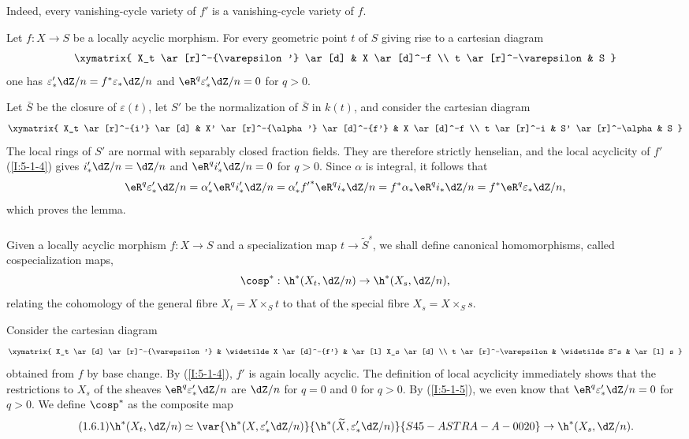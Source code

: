 Indeed, every vanishing-cycle variety of $f'$ is a vanishing-cycle
variety of $f$.

\begin{lemma}\label{I:5-1-5}
Let $f:X\to S$ be a locally acyclic morphism. For every geometric point
$t$ of $S$ giving rise to a cartesian diagram
\[\xymatrix{
  X_t \ar[r]^-{\varepsilon'} \ar[d]
    & X \ar[d]^-f \\
  t \ar[r]^-\varepsilon
    & S
}\]
one has $\varepsilon_*'\dZ/n=f^*\varepsilon_*\dZ/n$ and
$\eR^q\varepsilon_*'\dZ/n=0$ for $q>0$.
\end{lemma}

Let $\bar S$ be the closure of $\varepsilon(t)$, let $S'$ be the
normalization of $\bar S$ in $k(t)$, and consider the cartesian diagram
\[\xymatrix{
  X_t \ar[r]^-{i'} \ar[d]
    & X' \ar[r]^-{\alpha'} \ar[d]^-{f'}
    & X \ar[d]^-f \\
  t \ar[r]^-i
    & S' \ar[r]^-\alpha
    & S
}\]
The local rings of $S'$ are normal with separably closed fraction fields.
They are therefore strictly henselian, and the local acyclicity of $f'$
(\ref{I:5-1-4}) gives
$i'_*\dZ/n=\dZ/n$ and $\eR^q i'_*\dZ/n=0$ for $q>0$. Since $\alpha$
is integral, it follows that
\[
  \eR^q\varepsilon_*'\dZ/n
    = \alpha_*' \eR^q i_*' \dZ/n
    = \alpha_*' {f'}^* \eR^q i_* \dZ/n
    = f^* \alpha_* \eR^q i_* \dZ/n
    = f^* \eR^q \varepsilon_* \dZ/n \text{,}
\]
which proves the lemma.

\subsubsection{}\label{I:5-1-6}

Given a locally acyclic morphism $f:X\to S$ and a specialization map
$t\to\widetilde S^s$, we shall define canonical homomorphisms, called
cospecialization maps,
\[
  \cosp^* : \h^*(X_t,\dZ/n) \to \h^*(X_s,\dZ/n)\text{,}
\]
relating the cohomology of the general fibre $X_t=X\times_St$ to that of
the special fibre $X_s=X\times_Ss$.

Consider the cartesian diagram
\[\xymatrix{
  X_t \ar[d] \ar[r]^-{\varepsilon'}
    & \widetilde X \ar[d]^-{f'}
    & \ar[l] X_s \ar[d] \\
  t \ar[r]^-\varepsilon
    & \widetilde S^s
    & \ar[l] s
}\]
obtained from $f$ by base change. By (\ref{I:5-1-4}), $f'$ is again
locally acyclic. The definition of local acyclicity immediately shows that
the restrictions to $X_s$ of the sheaves $\eR^q\varepsilon_*'\dZ/n$ are
$\dZ/n$ for $q=0$ and $0$ for $q>0$. By (\ref{I:5-1-5}), we even know
that $\eR^q\varepsilon_*'\dZ/n=0$ for $q>0$. We define
$\cosp^*$ as the composite map
\begin{equation*}\tag{1.6.1}\label{I:eq:5-1-6-1}
  \h^*(X_t,\dZ/n) \simeq \var{\h^*(X,\varepsilon_*' \dZ/n)}{\h^*(\widetilde X,\varepsilon_*' \dZ/n)}{S45-ASTRA-A-0020} \to \h^*(X_s,\dZ/n) \text{.}
\end{equation*}

